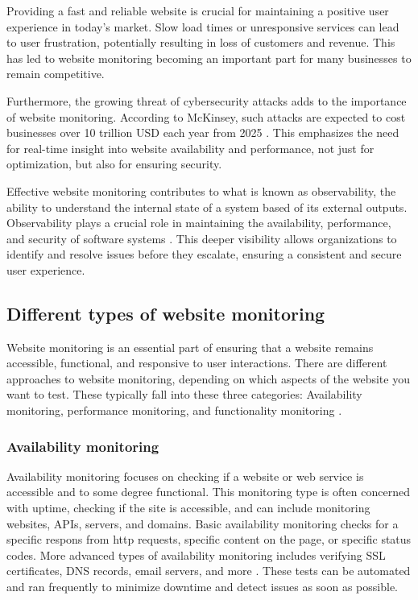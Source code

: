 Providing a fast and reliable website is crucial for maintaining a positive user experience in today's market. Slow load times or unresponsive services can lead to user frustration, potentially resulting in loss of customers and revenue. This has led to website monitoring becoming an important part for many businesses to remain competitive.

Furthermore, the growing threat of cybersecurity attacks adds to the importance of website monitoring. According to McKinsey, such attacks are expected to cost businesses over 10 trillion USD each year from 2025 \autocite{McKinsey}. This emphasizes the need for real-time insight into website availability and performance, not just for optimization, but also for ensuring security.

Effective website monitoring contributes to what is known as observability, the ability to understand the internal state of a system based of its external outputs. Observability plays a crucial role in maintaining the availability, performance, and security of software systems \autocite{IBMobservability}. This deeper visibility allows organizations to identify and resolve issues before they escalate, ensuring a consistent and secure user experience.

\subsection{Different types of website monitoring}
\label{subsec:monitoring_types}


Website monitoring is an essential part of ensuring that a website remains accessible, functional, and responsive to user interactions. There are different approaches to website monitoring, depending on which aspects of the website you want to test. These typically fall into these three categories: Availability monitoring, performance monitoring, and functionality monitoring \autocite{Uptrendsmonitoring}.

\subsubsection{Availability monitoring}
\label{subsubsec:availability_monitoring}


Availability monitoring focuses on checking if a website or web service is accessible and to some degree functional. This monitoring type is often concerned with uptime, checking if the site is accessible, and can include monitoring websites, APIs, servers, and domains. Basic availability monitoring checks for a specific respons from \acrshort{http} requests, specific content on the page, or specific status codes. More advanced types of availability monitoring includes verifying SSL certificates, DNS records, email servers, and more \autocite{Uptrendsmonitoring}. These tests can be automated and ran frequently to minimize downtime and detect issues as soon as possible.

